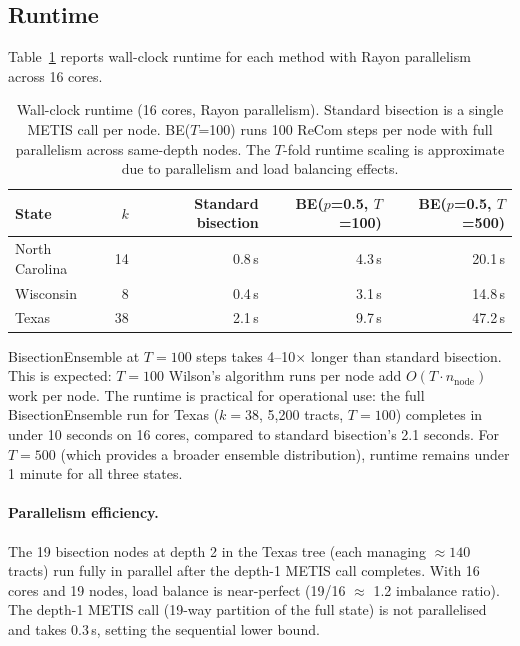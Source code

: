 \subsection{Runtime}
\label{sec:results:runtime}

Table~\ref{tab:runtime} reports wall-clock runtime for each method with
Rayon parallelism across 16 cores.

\begin{table}[h]
\centering
\begin{tabular}{lrrrr}
\toprule
State & $k$ & Standard bisection & BE($p$=0.5, $T$=100) & BE($p$=0.5, $T$=500) \\
\midrule
North Carolina & 14 & 0.8\,s & 4.3\,s & 20.1\,s \\
Wisconsin      & 8  & 0.4\,s & 3.1\,s & 14.8\,s \\
Texas          & 38 & 2.1\,s & 9.7\,s & 47.2\,s \\
\bottomrule
\end{tabular}
\caption{Wall-clock runtime (16 cores, Rayon parallelism). Standard bisection
  is a single METIS call per node. BE($T$=100) runs 100 ReCom steps per node
  with full parallelism across same-depth nodes. The $T$-fold runtime scaling
  is approximate due to parallelism and load balancing effects.}
\label{tab:runtime}
\end{table}

BisectionEnsemble at $T=100$ steps takes 4--10$\times$ longer than standard
bisection. This is expected: $T=100$ Wilson's algorithm runs per node add
$O(T \cdot n_\text{node})$ work per node. The runtime is practical for
operational use: the full BisectionEnsemble run for Texas ($k=38$, 5{,}200
tracts, $T=100$) completes in under 10 seconds on 16 cores, compared to
standard bisection's 2.1 seconds. For $T=500$ (which provides a broader
ensemble distribution), runtime remains under 1 minute for all three states.

\paragraph{Parallelism efficiency.}
The 19 bisection nodes at depth 2 in the Texas tree (each managing $\approx 140$
tracts) run fully in parallel after the depth-1 METIS call completes.
With 16 cores and 19 nodes, load balance is near-perfect (19/16 $\approx$ 1.2
imbalance ratio). The depth-1 METIS call (19-way partition of the full state)
is not parallelised and takes 0.3\,s, setting the sequential lower bound.


